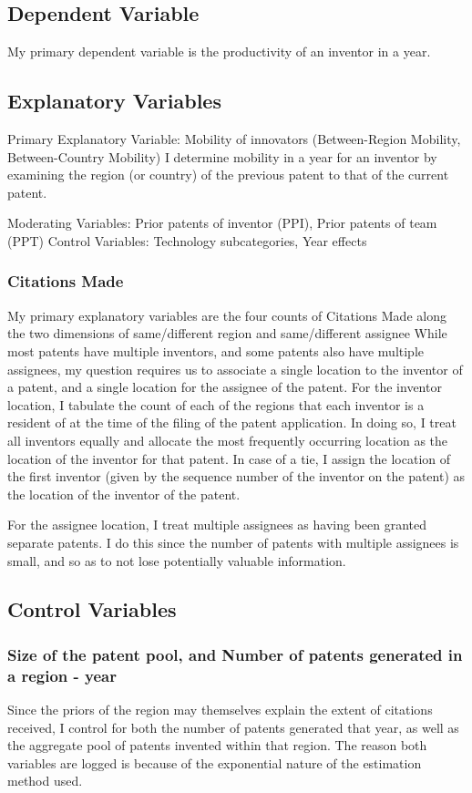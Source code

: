 \documentclass[12pt]{article}
\begin{document}
\subsection{Dependent Variable}
My primary dependent variable is the productivity of an inventor in a year. 

\subsection{Explanatory Variables}
Primary Explanatory Variable: Mobility of innovators (Between-Region Mobility, Between-Country Mobility) I  determine mobility in a year for an inventor by examining the region (or country) of the previous patent to that of the current patent.\par

Moderating Variables: Prior patents of inventor (PPI), Prior patents of team (PPT)
Control Variables: Technology subcategories,  Year effects
\subsubsection{Citations Made}
My primary explanatory variables are the four counts of Citations Made along the two dimensions of same/different region and same/different assignee
While most patents have multiple inventors, and some patents also have multiple assignees, my question requires us to associate a single location to the inventor of a patent, and a single location for the assignee of the patent. For the inventor location, I tabulate the count of each of the regions that each inventor is a resident of at the time of the filing of the patent application. In doing so, I treat all inventors equally and allocate the most frequently occurring location as the location of the inventor for that patent. In case of a tie, I assign the location of the first inventor (given by the sequence number of the inventor on the patent) as the location of the inventor of the patent. 

For the assignee location, I treat multiple assignees as having been granted separate patents. I do this since the number of patents with multiple assignees is small, and so as to not lose potentially valuable information.

\subsection{Control Variables}
\subsubsection{Size of the patent pool, and Number of patents generated in a region - year}
Since the priors of the region may themselves explain the extent of citations received, I control for both the number of patents generated that year, as well as the aggregate pool of patents invented within that region. The reason both variables are logged is because of the exponential nature of the estimation method used.
\end{document}
